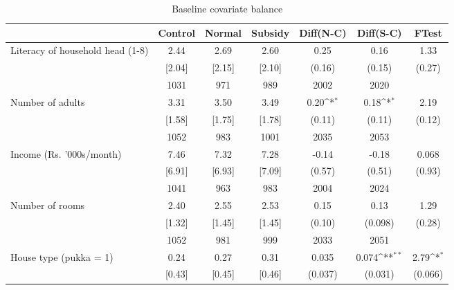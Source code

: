 \begin{table}[htbp]\centering
\def\sym#1{\ifmmode^{#1}\else\(^{#1}\)\fi}
\caption{Baseline covariate balance \label{tab:"balance"}}
\begin{tabular*}{1\hsize}{@{\hskip\tabcolsep\extracolsep\fill}l*{1}{cccccc}}
\toprule
                                &  Control&   Normal&  Subsidy&Diff(N-C)         &Diff(S-C)         &    FTest         \\
\midrule
Literacy of household head (1-8)&     2.44&     2.69&     2.60&     0.25         &     0.16         &     1.33         \\
                                &   [2.04]&   [2.15]&   [2.10]&   (0.16)         &   (0.15)         &   (0.27)         \\
                                &     1031&      971&      989&     2002         &     2020         &                  \\
Number of adults                &     3.31&     3.50&     3.49&     0.20\sym{*}  &     0.18\sym{*}  &     2.19         \\
                                &   [1.58]&   [1.75]&   [1.78]&   (0.11)         &   (0.11)         &   (0.12)         \\
                                &     1052&      983&     1001&     2035         &     2053         &                  \\
Income (Rs. '000s/month)        &     7.46&     7.32&     7.28&    -0.14         &    -0.18         &    0.068         \\
                                &   [6.91]&   [6.93]&   [7.09]&   (0.57)         &   (0.51)         &   (0.93)         \\
                                &     1041&      963&      983&     2004         &     2024         &                  \\
Number of rooms                 &     2.40&     2.55&     2.53&     0.15         &     0.13         &     1.29         \\
                                &   [1.32]&   [1.45]&   [1.45]&   (0.10)         &  (0.098)         &   (0.28)         \\
                                &     1052&      981&      999&     2033         &     2051         &                  \\
House type (pukka = 1)          &     0.24&     0.27&     0.31&    0.035         &    0.074\sym{**} &     2.79\sym{*}  \\
                                &   [0.43]&   [0.45]&   [0.46]&  (0.037)         &  (0.031)         &  (0.066)         \\

\end{tabular*}
\end{table}
